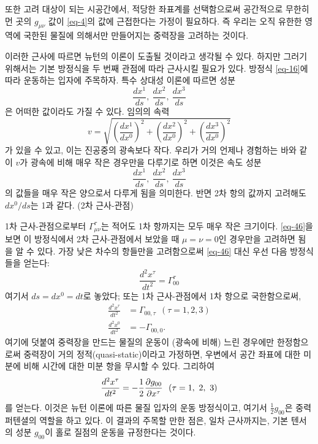 \documentclass[b5paper]{article}
\begin{document}
또한 고려 대상이 되는 시공간에서, 적당한 좌표계를 선택함으로써 공간적으로 무한히 먼 곳의 $g_{\mu\nu}$ 값이  \eqref{eq-4}의 값에 근접한다는 가정이 필요하다. 즉 우리는 오직 유한한 영역에 국한된 물질에 의해서만 만들어지는 중력장을 고려하는 것이다.

이러한 근사에 따르면 뉴턴의 이론이 도출될 것이라고 생각될 수 있다. 하지만 그러기 위해서는 기본 방정식을 두 번째 관점에 따라 근사시킬 필요가 있다. 방정식 \eqref{eq-16}에 따라 운동하는 입자에 주목하자. 특수 상대성 이론에 따르면 성분
\begin{equation*}
	\frac{dx^1}{ds},~\frac{dx^2}{ds},~\frac{dx^3}{ds}
\end{equation*}
은 어떠한 값이라도 가질 수 있다. 임의의 속력
\begin{equation*}
	v=\sqrt{\left(\frac{dx^1}{dx^0}\right)^2 + \left(\frac{dx^2}{dx^0}\right)^2 + \left(\frac{dx^3}{dx^0}\right)^2}
\end{equation*}
가 있을 수 있고, 이는 진공중의 광속보다 작다. 우리가 거의 언제나 경험하는 바와 같이 $v$가 광속에 비해 매우 작은 경우만을 다루기로 하면 이것은 속도 성분
\begin{equation*}
\frac{dx^1}{ds},~\frac{dx^2}{ds},~\frac{dx^3}{ds}
\end{equation*}
의 값들을 매우 작은 양으로서 다루게 됨을 의미한다. 반면 2차 항의 값까지 고려해도 $dx^0/ds$는 1과 같다. (2차 근사-관점)

1차 근사-관점으로부터 $\Gamma_{\mu\nu}^\tau$는 적어도 1차 항까지는 모두 매우 작은 크기이다. \eqref{eq-46}을 보면 이 방정식에서 2차 근사-관점에서 보았을 때 $\mu=\nu=0$인 경우만을 고려하면 됨을 알 수 있다. 가장 낮은 차수의 항들만을 고려함으로써 \eqref{eq-46} 대신 우선 다음 방정식들을 얻는다:
\begin{equation*}
	\frac{d^2 x^\tau}{dt^2}=\Gamma_{0 0}^\tau
\end{equation*}
여기서 $ds = dx^0 = dt$로 놓았다; 또는 1차 근사-관점에서 1차 항으로 국한함으로써,
\begin{equation*}
	\begin{aligned}
	\frac{d^2 x^\tau}{dt^2} &= \Gamma_{0 0 , \tau}~~ (\tau = 1, 2, 3)\\
	\frac{d^2 x^0}{dt^2} &= -\Gamma_{0 0 , 0}.
	\end{aligned}
\end{equation*}
여기에 덧붙여 중력장을 만드는 물질의 운동이 (광속에 비해) 느린 경우에만 한정함으로써 중력장이 거의 정적(quasi-static)이라고 가정하면, 우변에서 공간 좌표에 대한 미분에 비해 시간에 대한 미분 항을 무시할 수 있다. 그리하여
\begin{equation} \label{eq-67}
	\frac{d^2 x^\tau}{dt^2} = -\frac{1}{2} {\frac{{\partial}{g_{0 0}}}{{\partial}{x^\tau}}} ~~(\tau=1,\ 2,\ 3)
\end{equation}
를 얻는다. 이것은 뉴턴 이론에 따른 물질 입자의 운동 방정식이고, 여기서 $\frac{1}{2}g_{0 0}$은 중력 퍼텐셜의 역할을 하고 있다. 이 결과의 주목할 만한 점은, 일차 근사까지는, 기본 텐서의 성분 $g_{0 0}$이 홀로 질점의 운동을 규정한다는 것이다.
\end{document}
